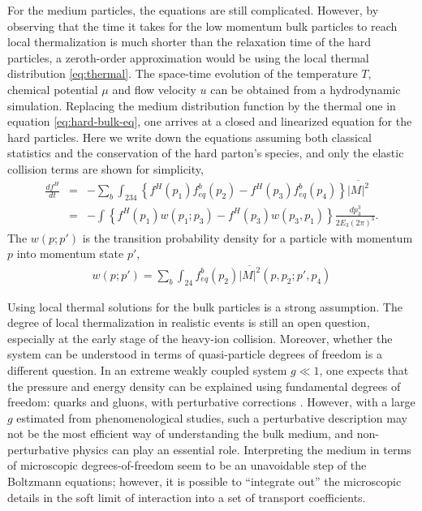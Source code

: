 For the medium particles, the equations are still complicated.
However, by observing that the time it takes for the low momentum bulk particles to reach local thermalization is much shorter than the relaxation time of the hard particles, a zeroth-order approximation would be using the local thermal distribution \ref{eq:thermal}.
The space-time evolution of the temperature $T$, chemical potential $\mu$ and flow velocity $u$ can be obtained from a hydrodynamic simulation.
Replacing the medium distribution function by the thermal one in equation \ref{eq:hard-bulk-eq}, one arrives at a closed and linearized equation for the hard particles.
Here we write down the equations assuming both classical statistics and the conservation of the hard parton's species, and only the elastic collision terms are shown for simplicity,
\begin{eqnarray}
\frac{df^H}{dt} &=& -\sum_{b} \int_{234} \left\{
f^H(p_1)f^b_{eq}(p_2) - f^H(p_3)f^b_{eq}(p_4)\right\}
\overline{|M|^2} \\
&=& - \int \left\{
f^H(p_1) w(p_1; p_3) - f^H(p_3) w(p_3, p_1)\right\}\frac{dp_3^3}{2E_3 (2\pi)^3}.
\end{eqnarray}
The $w(p; p')$ is the transition probability density for a particle with momentum $p$ into momentum state $p'$,
\begin{eqnarray}
w(p; p') = \sum_b\int_{24} f_{eq}^b(p_2) \overline{|M|^2}(p, p_2; p', p_4)
\end{eqnarray}

Using local thermal solutions for the bulk particles is a strong assumption. 
The degree of local thermalization in realistic events is still an open question, especially at the early stage of the heavy-ion collision. 
Moreover, whether the system can be understood in terms of quasi-particle degrees of freedom is a different question.
In an extreme weakly coupled system $g\ll 1$, one expects that the pressure and energy density can be explained using fundamental degrees of freedom: quarks and gluons, with perturbative corrections \cite{Blaizot:2000fc,Strickland:2010tm,Su:2015esa}.
However, with a large $g$ estimated from phenomenological studies, such a perturbative description may not be the most efficient way of understanding the bulk medium, and non-perturbative physics can play an essential role. 
Interpreting the medium in terms of microscopic degrees-of-freedom seem to be an unavoidable step of the Boltzmann equations; however, it is possible to ``integrate out'' the microscopic details in the soft limit of interaction into a set of transport coefficients.

